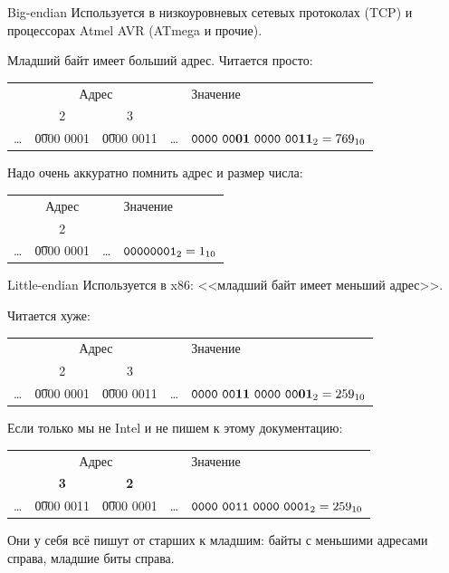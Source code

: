 \begin{frame}{Big-endian}
	Используется в низкоуровневых сетевых протоколах (TCP) и процессорах Atmel AVR (ATmega и прочие).

	Младший байт имеет больший адрес.
	Читается просто:
	\begin{center}
		\begin{tabular}{|c|c|c|c|l|}
			\hline
			\multicolumn{4}{|c|}{Адрес} & Значение \\
			& 2 & 3 & & \\\hline
			\dots & \t{0000 0001} & \t{0000 0011} & \dots & $\t{0000~00\textbf{01}~0000~00\textbf{11}}_2=769_{10}$ \\
			\hline
		\end{tabular}
	\end{center}

	Надо очень аккуратно помнить адрес и размер числа:
	\begin{center}
		\begin{tabular}{|c|c|c|l|}
			\hline
			\multicolumn{3}{|c|}{Адрес} & Значение \\
			& 2 & & \\\hline
			\dots & \t{0000 0001} & \dots & $\t{0000 0001}_2=1_{10}$ \\
			\hline
		\end{tabular}
	\end{center}
\end{frame}

\begin{frame}{Little-endian}
	Используется в x86: <<младший байт имеет меньший адрес>>.

	Читается хуже:
	\begin{center}
		\begin{tabular}{|c|c|c|c|l|}
			\hline
			\multicolumn{4}{|c|}{Адрес} & Значение \\
			& 2 & 3 & & \\\hline
			\dots & \t{0000 0001} & \t{0000 0011} & \dots & $\t{0000~00\textbf{11}~0000~00\textbf{01}}_2=259_{10}$ \\
			\hline
		\end{tabular}
	\end{center}
	Если только мы не Intel и не пишем к этому документацию:
	\begin{center}
		\begin{tabular}{|c|c|c|c|l|}
			\hline
			\multicolumn{4}{|c|}{Адрес} & Значение \\
			& \textbf{3} & \textbf{2} & & \\\hline
			\dots & \t{0000 0011} & \t{0000 0001} & \dots & $\t{0000~0011~0000~0001}_2=259_{10}$ \\
			\hline
		\end{tabular}
	\end{center}
	Они у себя всё пишут от старших к младшим: байты с меньшими адресами справа, младшие биты справа.
\end{frame}

